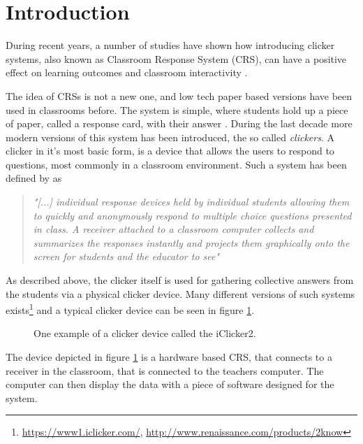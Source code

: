 \section{Introduction}
During recent years, a number of studies have shown how introducing clicker systems, also known as Classroom Response System (CRS), can have a positive effect on learning outcomes and classroom interactivity \cite{yourstone2008classroom, siau2006use, lantz2014effectiveness}.

The idea of CRSs is not a new one, and low tech paper based versions have been used in classrooms before. The system is simple, where students hold up a piece of paper, called a response card, with their answer \cite{ralph1994effects}. During the last decade more modern versions of this system has been introduced, the so called \emph{clickers}. A clicker in it's most basic form, is a device that allows the users to respond to questions, most commonly in a classroom environment. Such a system has been defined by  as 

\begin{quote}
    \emph{"[...] individual response devices held by individual students allowing them to quickly and anonymously respond to multiple choice questions presented in class. A receiver attached to a classroom computer collects and summarizes the responses instantly and projects them graphically onto the screen for students and the educator to see"} \cite[p.~280]{lantz2014effectiveness}
\end{quote}

As described above, the clicker itself is used for gathering collective answers from the students via a physical clicker device. Many different versions of such systems exists\footnote{\url{https://www1.iclicker.com/}, \url{http://www.renaissance.com/products/2know}} and a typical clicker device can be seen in figure \ref{fig:iclicker}.

\begin{figure}[H]
\capstart
	\centering
	\caption[iClicker2]{One example of a clicker device called the iClicker2.}\label{fig:iclicker}
\end{figure}

The device depicted in figure \ref{fig:iclicker} is a hardware based CRS, that connects to a receiver in the classroom, that is connected to the teachers computer. The computer can then display the data with a piece of software designed for the system.

